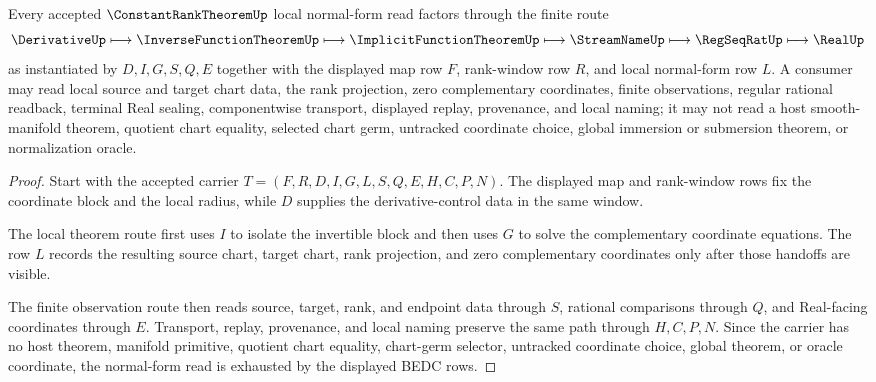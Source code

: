 \begin{theorem}
\label{thm:constant-rank-theorem-local-normal-form-route}
Every accepted $\ConstantRankTheoremUp$ local normal-form read factors through the finite route
$$
\DerivativeUp \longmapsto \InverseFunctionTheoremUp \longmapsto \ImplicitFunctionTheoremUp \longmapsto \StreamNameUp \longmapsto \RegSeqRatUp \longmapsto \RealUp
$$
as instantiated by $D,I,G,S,Q,E$ together with the displayed map row $F$, rank-window row $R$, and local normal-form row $L$. A consumer may read local source and target chart data, the rank projection, zero complementary coordinates, finite observations, regular rational readback, terminal Real sealing, componentwise transport, displayed replay, provenance, and local naming; it may not read a host smooth-manifold theorem, quotient chart equality, selected chart germ, untracked coordinate choice, global immersion or submersion theorem, or normalization oracle.
\end{theorem}
\begin{proof}
Start with the accepted carrier $T=(F,R,D,I,G,L,S,Q,E,H,C,P,N)$. The displayed map and rank-window rows fix the coordinate block and the local radius, while $D$ supplies the derivative-control data in the same window.

The local theorem route first uses $I$ to isolate the invertible block and then uses $G$ to solve the complementary coordinate equations. The row $L$ records the resulting source chart, target chart, rank projection, and zero complementary coordinates only after those handoffs are visible.

The finite observation route then reads source, target, rank, and endpoint data through $S$, rational comparisons through $Q$, and Real-facing coordinates through $E$. Transport, replay, provenance, and local naming preserve the same path through $H,C,P,N$. Since the carrier has no host theorem, manifold primitive, quotient chart equality, chart-germ selector, untracked coordinate choice, global theorem, or oracle coordinate, the normal-form read is exhausted by the displayed BEDC rows.
\end{proof}


